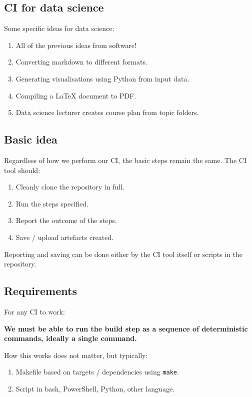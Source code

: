 \documentclass[slides]{pgnotes}
\begin{document}
\subsection{CI for data science}

Some specific ideas for data science:

\begin{enumerate}
\item All of the previous ideas from software!
\item Converting markdown to different formats.
\item Generating visualisations using Python from input data.
\item Compiling a LaTeX document to PDF.
\item Data science lecturer creates course plan from topic folders.
\end{enumerate}


\subsection{Basic idea}

Regardless of how we perform our CI, the basic steps remain the same.
The CI tool should:

\begin{enumerate}
\item Cleanly clone the repository in full.
\item Run the steps specified.
\item Report the outcome of the steps.
\item Save / upload artefacts created.
\end{enumerate}

Reporting and saving can be done either by the CI tool itself or scripts in the repository.


\subsection{Requirements}

For any CI to work:

\begin{center}
\textbf{We must be able to run the build step as a sequence of deterministic commands, ideally a single command.}
\end{center}

How this works does not matter, but typically:

\begin{enumerate}
\item Makefile based on targets / dependencies using \texttt{make}.
\item Script in bash, PowerShell, Python, other language.
\end{enumerate}
\end{document}
